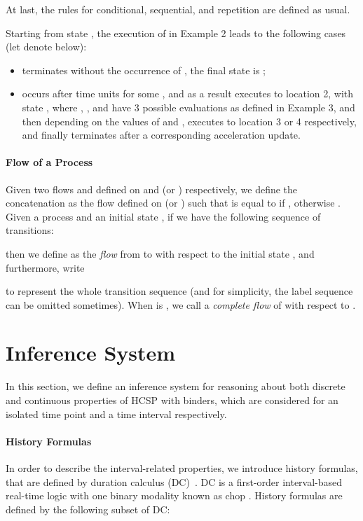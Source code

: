 \documentclass{llncs}
\begin{document}
At last, the rules for conditional, sequential,  and repetition are defined as usual.

\example
Starting from state , the execution
of  in Example 2 leads to the following cases (let  denote  below):
\begin{itemize}
\item  terminates without the occurrence of ,
the final state is ;
\item  occurs after  time units for some , and as a result  executes to location 2, with state , where  , ,  and  have 3 possible evaluations as defined in Example 3,  and then depending on the values of  and , executes to location 3 or 4  respectively, and finally terminates after a corresponding acceleration update. 
\end{itemize}

\paragraph{\textbf{Flow of a Process}}
Given two flows  and  defined on  and  (or )
respectively, we define the concatenation   as the
flow defined on  (or ) such that  is equal to  if , otherwise
. Given a process  and an initial state , if we have the following sequence of transitions:

then we define  as the \emph{flow} from  to  with respect to the initial state ,
and furthermore, write

to represent the whole transition sequence (and for simplicity, the label sequence can be omitted sometimes).
When  is , we call  a \emph{complete flow} of  with respect to  .


\section{Inference System}
\label{sec:inference}

In this section, we define an inference system for reasoning about both discrete and continuous properties of HCSP with binders,
which are considered for an isolated time point and a time interval respectively.


\paragraph{\textbf{History Formulas}}
In order to describe the interval-related properties,
we  introduce history formulas,  that are defined by duration calculus (DC)~\cite{ZHR91,ZH04}.
DC is a first-order interval-based
real-time logic with one binary modality known as chop . History formulas  are defined
by the following subset of DC:
\end{document}
